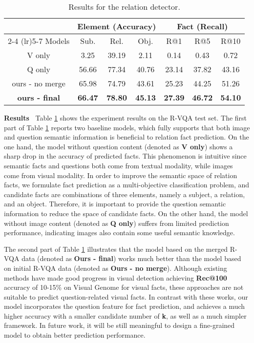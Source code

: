 \documentclass[sigconf]{acmart}
\begin{document}
\begin{table}[t]
	\centering 
	\small
	\begin{tabular}{*7{c}} 
		\toprule	
		\multirow{2}{*}{}	
		& \multicolumn{3}{c}{Element (Accuracy)} 	
		& \multicolumn{3}{c}{Fact (Recall)}  \\
		\cmidrule(lr){2-4} 	\cmidrule(lr){5-7} 	
		Models  	&  Sub.   &   Rel.	&  Obj.&  R@1 & R@5	&  R@10  \\
		\midrule
		V only 		& 3.25	& 39.19	& 2.11   	& 0.14 & 0.43 & 0.72  \\
		Q only 		& 56.66	& 77.34	& 40.76 	& 23.14	& 37.82	& 43.16  \\
		\midrule
		ours - no merge 		& 65.98	& 74.79	& 43.61 	& 25.23	& 44.25	& 51.26  \\
		\textbf{ours - final}	& \textbf{66.47} & \textbf{78.80} & \textbf{45.13} 	
		& \textbf{27.39} & \textbf{46.72} & \textbf{54.10}  \\
		\bottomrule		
	\end{tabular}
	\caption{Results for the relation detector.}
	\label{tab:detector-result}
\end{table}




\textbf{Results~} Table \ref{tab:detector-result} shows the experiment results on the R-VQA test set.
The first part of Table \ref{tab:detector-result} reports two baseline models,
which fully supports that both image and question semantic information is beneficial to relation fact prediction. 
On the one hand, the model without question content (denoted as \textbf{V only}) shows a sharp drop in the accuracy of predicted facts.
This phenomenon is intuitive since semantic facts and questions both come from textual modality, while images come from visual modality.
In order to improve the semantic space of relation facts, we formulate fact prediction as a multi-objective classification problem,
and candidate facts are combinations of three elements, namely a subject, a relation, and an object.
Therefore, it is important to provide the question semantic information to reduce the space of candidate facts. 
On the other hand, the model without image content (denoted as \textbf{Q only}) suffers from limited prediction performance,
indicating images also contain some useful semantic knowledge.

The second part of Table \ref{tab:detector-result} illustrates that the model based on the merged R-VQA data (denoted as \textbf{Ours - final})
works much better than the model  based on initial R-VQA data (denoted as \textbf{Ours - no merge}). 
Although existing methods have made good progress in visual detection achieving \textbf{Rec@100} accuracy of 10-15\% on Visual Genome for visual facts, these approaches are not suitable to predict question-related visual facts.
In contrast with these works, our model incorporates the question feature for fact prediction,
and achieves a much higher accuracy with a smaller candidate number of \textbf{k}, as well as a much simpler framework.
In future work, it will be still meaningful to design a fine-grained model to obtain better prediction performance.
\end{document}
